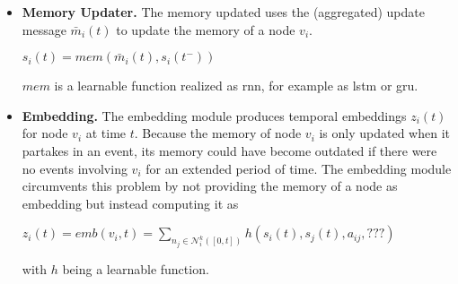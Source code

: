 \begin{itemize}
    \item \textbf{Memory Updater.} The memory updated uses the (aggregated) update message $\bar{m}_i(t)$ to update the memory of a node $v_i$.
    \begin{center}
        $s_i(t) = mem(\bar{m}_i(t), s_i(t^-))$
    \end{center}
    $mem$ is a learnable function realized as \gls{rnn}, for example as \gls{lstm} or \gls{gru}.
    \item \textbf{Embedding.} The embedding module produces temporal embeddings $z_i(t)$ for node $v_i$ at time $t$. Because the memory of node $v_i$ is only updated when it partakes in an event, its memory could have become outdated if there were no events involving $v_i$ for an extended period of time. The embedding module circumvents this problem by not providing the memory of a node as embedding but instead computing it as
    \begin{center}
        $z_i(t) = emb(v_i,t) = \sum_{n_j \in \mathcal{N}^k_i([0,t])} h(s_i(t), s_j(t), a_{ij}, ???)$
    \end{center}
    with $h$ being a learnable function.
\end{itemize}
\fi


